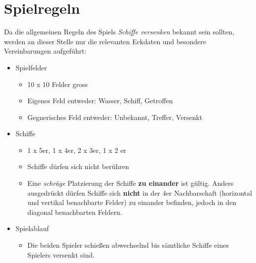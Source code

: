 \section{Spielregeln}
\label{sec:Spielregeln}

Da die allgemeinen Regeln des Spiels \textit{Schiffe versenken} bekannt sein sollten, werden an dieser Stelle nur die relevanten Eckdaten 
und besondere Vereinbarungen aufgeführt:


\begin{itemize}
	\item Spielfelder
		\begin{itemize}
			\item 10 x 10 Felder gross
			\item Eigenes Feld entweder: Wasser, Schiff, Getroffen
			\item Gegnerisches Feld entweder: Unbekannt, Treffer, Versenkt
		\end{itemize}
	\item Schiffe
		\begin{itemize}
			\item 1 x 5er, 1 x 4er, 2 x 3er, 1 x 2 er
			\item Schiffe dürfen sich nicht berühren
			\item Eine \textit{schräge} Platzierung der Schiffe \textbf{zu einander} ist gültig. Anders ausgedrückt dürfen Schiffe sich \textbf{nicht} in
				der 4er Nachbarschaft (horizontal und vertikal benachbarte Felder) zu einander befinden, jedoch in den diagonal benachbarten Feldern.
		\end{itemize}
	\item Spielablauf
		\begin{itemize}
			\item Die beiden Spieler schießen abwechselnd bis sämtliche Schiffe eines Spielers versenkt sind.
		\end{itemize}
	
\end{itemize}